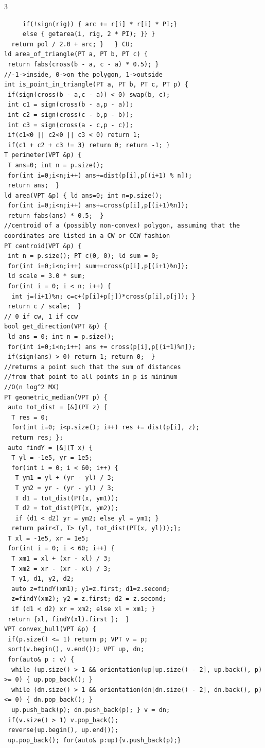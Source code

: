 \documentclass[8pt,a4paper,onesided]{article}
\begin{document}
\begin{multicols}{3}
\begin{verbatim}
     if(!sign(rig)) { arc += r[i] * r[i] * PI;}
     else { getarea(i, rig, 2 * PI); }} }
  return pol / 2.0 + arc; }   } CU;
ld area_of_triangle(PT a, PT b, PT c) {
 return fabs(cross(b - a, c - a) * 0.5); }
//-1->inside, 0->on the polygon, 1->outside
int is_point_in_triangle(PT a, PT b, PT c, PT p) {
 if(sign(cross(b - a,c - a)) < 0) swap(b, c);
 int c1 = sign(cross(b - a,p - a));
 int c2 = sign(cross(c - b,p - b));
 int c3 = sign(cross(a - c,p - c));
 if(c1<0 || c2<0 || c3 < 0) return 1;
 if(c1 + c2 + c3 != 3) return 0; return -1; }
T perimeter(VPT &p) {
 T ans=0; int n = p.size();
 for(int i=0;i<n;i++) ans+=dist(p[i],p[(i+1) % n]);
 return ans;  }
ld area(VPT &p) { ld ans=0; int n=p.size();
 for(int i=0;i<n;i++) ans+=cross(p[i],p[(i+1)%n]);
 return fabs(ans) * 0.5;  }
//centroid of a (possibly non-convex) polygon, assuming that the coordinates are listed in a CW or CCW fashion
PT centroid(VPT &p) {
 int n = p.size(); PT c(0, 0); ld sum = 0;
 for(int i=0;i<n;i++) sum+=cross(p[i],p[(i+1)%n]);
 ld scale = 3.0 * sum;
 for(int i = 0; i < n; i++) {
  int j=(i+1)%n; c=c+(p[i]+p[j])*cross(p[i],p[j]); }
 return c / scale;  }
// 0 if cw, 1 if ccw
bool get_direction(VPT &p) {
 ld ans = 0; int n = p.size();
 for(int i=0;i<n;i++) ans += cross(p[i],p[(i+1)%n]);
 if(sign(ans) > 0) return 1; return 0;  }
//returns a point such that the sum of distances
//from that point to all points in p is minimum
//O(n log^2 MX)
PT geometric_median(VPT p) {
 auto tot_dist = [&](PT z) {
  T res = 0;
  for(int i=0; i<p.size(); i++) res += dist(p[i], z);
  return res; };
 auto findY = [&](T x) {
  T yl = -1e5, yr = 1e5;
  for(int i = 0; i < 60; i++) {
   T ym1 = yl + (yr - yl) / 3;
   T ym2 = yr - (yr - yl) / 3;
   T d1 = tot_dist(PT(x, ym1));
   T d2 = tot_dist(PT(x, ym2));
   if (d1 < d2) yr = ym2; else yl = ym1; }
  return pair<T, T> (yl, tot_dist(PT(x, yl)));};
 T xl = -1e5, xr = 1e5;
 for(int i = 0; i < 60; i++) {
  T xm1 = xl + (xr - xl) / 3;
  T xm2 = xr - (xr - xl) / 3;
  T y1, d1, y2, d2;
  auto z=findY(xm1); y1=z.first; d1=z.second;
  z=findY(xm2); y2 = z.first; d2 = z.second;
  if (d1 < d2) xr = xm2; else xl = xm1; }
 return {xl, findY(xl).first };  }
VPT convex_hull(VPT &p) {
 if(p.size() <= 1) return p; VPT v = p;
 sort(v.begin(), v.end()); VPT up, dn;
 for(auto& p : v) {
  while (up.size() > 1 && orientation(up[up.size() - 2], up.back(), p) >= 0) { up.pop_back(); }
  while (dn.size() > 1 && orientation(dn[dn.size() - 2], dn.back(), p) <= 0) { dn.pop_back(); }
  up.push_back(p); dn.push_back(p); } v = dn;
 if(v.size() > 1) v.pop_back();
 reverse(up.begin(), up.end());
 up.pop_back(); for(auto& p:up){v.push_back(p);}

\end{verbatim}
\end{multicols}
\end{document}
